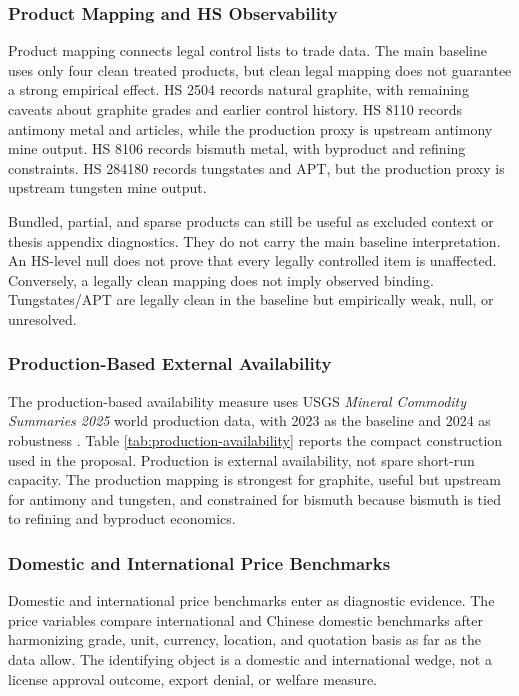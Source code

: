 \documentclass[12pt,a4paper]{article}
\numberwithin{equation}{section}
\begin{document}


\subsubsection{Product Mapping and HS Observability}

Product mapping connects legal control lists to trade data. The main baseline uses only four clean treated products, but clean legal mapping does not guarantee a strong empirical effect. HS 2504 records natural graphite, with remaining caveats about graphite grades and earlier control history. HS 8110 records antimony metal and articles, while the production proxy is upstream antimony mine output. HS 8106 records bismuth metal, with byproduct and refining constraints. HS 284180 records tungstates and APT, but the production proxy is upstream tungsten mine output.

Bundled, partial, and sparse products can still be useful as excluded context or thesis appendix diagnostics. They do not carry the main baseline interpretation. An HS-level null does not prove that every legally controlled item is unaffected. Conversely, a legally clean mapping does not imply observed binding. Tungstates/APT are legally clean in the baseline but empirically weak, null, or unresolved.

\subsubsection{Production-Based External Availability}

The production-based availability measure uses USGS \emph{Mineral Commodity Summaries 2025} world production data, with 2023 as the baseline and 2024 as robustness \citep{usgs_mcs_2025}. Table \ref{tab:production-availability} reports the compact construction used in the proposal. Production is external availability, not spare short-run capacity. The production mapping is strongest for graphite, useful but upstream for antimony and tungsten, and constrained for bismuth because bismuth is tied to refining and byproduct economics.



\subsubsection{Domestic and International Price Benchmarks}

Domestic and international price benchmarks enter as diagnostic evidence. The price variables compare international and Chinese domestic benchmarks after harmonizing grade, unit, currency, location, and quotation basis as far as the data allow. The identifying object is a domestic and international wedge, not a license approval outcome, export denial, or welfare measure.
\end{document}
